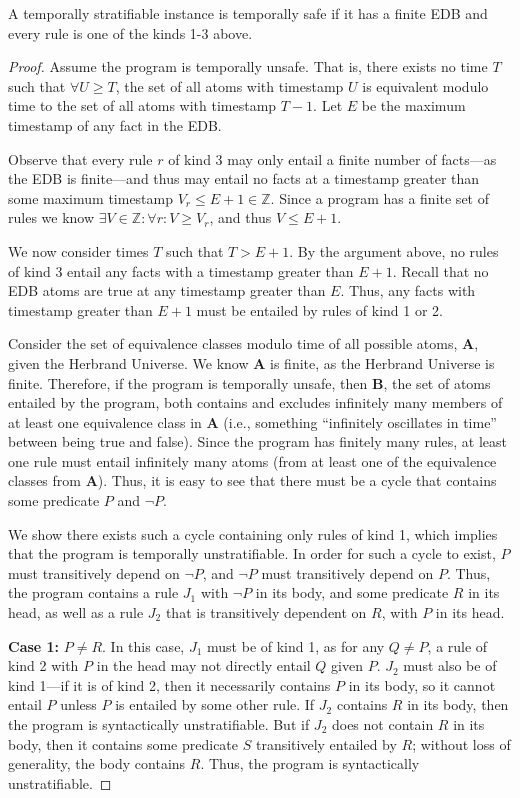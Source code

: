\begin{lemma} 
A temporally stratifiable \slang instance is temporally safe if it has a finite EDB and every rule is one of the kinds 1-3 above.
\end{lemma}
\begin{proof}
Assume the program is temporally unsafe.  That is, there exists no time $T$
such that $\forall U \ge T$, the set of all atoms with timestamp $U$ is
equivalent modulo time to the set of all atoms with timestamp $T-1$.  Let $E$
be the maximum timestamp of any fact in the EDB.

Observe that every rule $r$ of kind 3 may only entail a finite number
of facts---as the EDB is finite---and thus may entail no facts at a
timestamp greater than some maximum timestamp $V_r \le E+1 \in
\mathbb{Z}$.  Since a \slang program has a finite set of rules we know
$\exists V \in \mathbb{Z} : \forall r: V \ge V_r$, and thus $V \le E+1$.

We now consider times $T$ such that $T > E+1$.  By the argument above, no rules
of kind 3 entail any facts with a timestamp greater than $E+1$.  Recall that
no EDB atoms are true at any timestamp greater than $E$.  Thus, any facts with
timestamp greater than $E+1$ must be entailed by rules of kind 1 or 2.

Consider the set of equivalence classes modulo time of all possible atoms, {\bf
A}, given the Herbrand Universe.  We know {\bf A} is finite, as the Herbrand
Universe is finite.  Therefore, if the program is temporally unsafe, then {\bf B}, the
set of atoms entailed by the program, both contains and excludes
infinitely many members of at least one equivalence class in {\bf A} (i.e.,
something ``infinitely oscillates in time'' between being true and false).
Since the program has finitely many rules, at least one rule must entail
infinitely many atoms (from at least one of the equivalence classes from {\bf
A}). Thus, it is easy to see that there must be a cycle that contains some predicate $P$ and $\lnot P$.

We show there exists such a cycle containing only rules of kind 1, which
implies that the program is temporally unstratifiable.  In order for such a
cycle to exist, $P$ must transitively depend on $\lnot P$, and $\lnot P$ must
transitively depend on $P$.  Thus, the program contains a rule $J_1$ with
$\lnot P$ in its body, and some predicate $R$ in its head, as well as a rule
$J_2$ that is transitively dependent on $R$, with $P$ in its head.

{\bf Case 1: }$P \neq R$.  In this case, $J_1$ must be of kind 1, as for any $Q
\neq P$, a rule of kind 2 with $P$ in the head may not directly entail $Q$
given $P$.  $J_2$ must also be of kind 1---if it is of kind 2, then it
necessarily contains $P$ in its body, so it cannot entail $P$ unless $P$ is
entailed by some other rule.  If $J_2$ contains $R$ in its body, then the
program is syntactically unstratifiable.  But if $J_2$ does not contain $R$ in
its body, then it contains some predicate $S$ transitively entailed by $R$;
without loss of generality, the body contains $R$.  Thus, the program is syntactically unstratifiable.


\end{proof}
